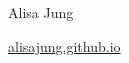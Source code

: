 \documentclass[10pt, letterpaper]{article}
\newenvironment{highlightsforbulletentries}{
    \begin{itemize}[
        topsep=0.10 cm,
        parsep=0.10 cm,
        partopsep=0pt,
        itemsep=0pt,
        leftmargin=10pt
    ]
}{
    \end{itemize}
} %
\newenvironment{onecolentry}{
    \begin{adjustwidth}{
        0 cm + 0.00001 cm
    }{
        0 cm + 0.00001 cm
    }
}{
    \end{adjustwidth}
} %
\newenvironment{header}{
    \setlength{\topsep}{0pt}\par\kern\topsep\centering\linespread{1.5}
}{
    \par\kern\topsep
} %
\let\hrefWithoutArrow\href
\begin{document}
    \newcommand{\AND}{\unskip
        \cleaders\copy\ANDbox\hskip\wd\ANDbox
        \ignorespaces
    }
    \newsavebox\ANDbox
    \sbox\ANDbox{$|$}

    \begin{header}
        \fontsize{25 pt}{25 pt}\selectfont Alisa Jung

        \vspace{5 pt}

        \normalsize
        \mbox{\hrefWithoutArrow{https://alisajung.github.io/}{alisajung.github.io}}%
    \end{header}

    \vspace{5 pt - 0.3 cm}


    









    \newcommand{\sectionspace}{\vspace{.45cm}}
\end{document}
